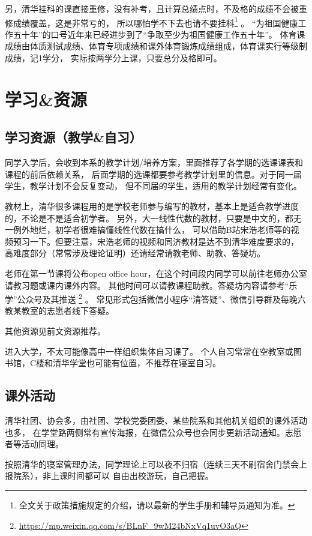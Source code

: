 \documentclass{article}
\begin{document}
另，清华挂科的课直接重修，没有补考，且计算总绩点时，不及格的成绩不会被重修成绩覆盖，这是非常亏的，
所以哪怕学不下去也请不要挂科\footnote{全文关于政策措施规定的介绍，请以最新的学生手册和辅导员通知为准。}
。
“为祖国健康工作五十年”的口号近年来已经进步到了“争取至少为祖国健康工作五十年”。
体育课成绩由体质测试成绩、体育专项成绩和课外体育锻炼成绩组成，体育课实行等级制成绩，记1学分，
实际按两学分上课，只要总分及格即可。

\section{学习\textnormal{\&}资源}
\subsection{学习资源（教学\textnormal{\&}自习）}
同学入学后，会收到本系的教学计划/培养方案，里面推荐了各学期的选课课表和课程的前后依赖关系，
后面学期的选课都要参考教学计划里的信息。对于同一届学生，教学计划不会反复变动，
但不同届的学生，适用的教学计划经常有变化。

教材上，清华很多课程用的是学校老师参与编写的教材，基本上是适合教学进度的，不论是不是适合初学者。
另外，大一线性代数的教材，只要是中文的，都无一例外地烂，初学者很难搞懂线性代数在搞什么，
可以借助B站宋浩老师等的视频预习一下。但要注意，宋浩老师的视频和同济教材是达不到清华难度要求的，
高难度部分（常常涉及理论证明）还请经常请教老师、助教、答疑坊。

老师在第一节课将公布open office hour，在这个时间段内同学可以前往老师办公室请教习题或课内课外内容。
其他时间可以请教课程助教。答疑坊内容请参考“乐学”公众号及其推送
\footnote{\url{https://mp.weixin.qq.com/s/BLnF_9wM24bNxVq1uvO3aQ}}
。
常见形式包括微信小程序“清答疑”、微信引导群及每晚六教某教室的志愿者线下答疑。

其他资源见前文资源推荐。

进入大学，不太可能像高中一样组织集体自习课了。
个人自习常常在空教室或图书馆，C楼和清华学堂也可能有位置，不推荐在寝室自习。

\subsection{课外活动}
清华社团、协会多，由社团、学校党委团委、某些院系和其他机关组织的课外活动也多，
在学堂路两侧常有宣传海报，在微信公众号也会同步更新活动通知。志愿者等活动同理。

按照清华的寝室管理办法，同学理论上可以夜不归宿（连续三天不刷宿舍门禁会上报院系），非上课时间都可以
自由出校游玩，自己把握。
\end{document}
